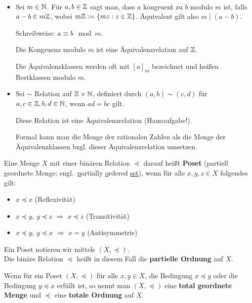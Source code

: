 \begin{bsp}\
\begin{itemize}	
	\item Sei $ m \in \mathbb{N} $. Für $ a,b \in \mathbb{Z} $ sagt man, dass $ a $ kongruent zu $ b $ modulo $ m $ ist, falls $ a-b \in m\mathbb{Z} $, wobei $ m\mathbb{Z} := \{ mz : z \in \mathbb{Z} \} $. Äquivalent gilt also $m \mid (a-b)$.
	
	Schreibweise: $ a \equiv b \mod{m} $.
	
	Die Kongruenz modulo $ m $ ist eine Äquivalenzrelation auf $ \mathbb{Z} $.
	
	Die Äquivalenzklassen werden oft mit $[a]_m$ bezeichnet und heißen Restklassen modulo $m$.
	
	\item Sei $ \sim $ Relation auf $ \mathbb{Z} \times \mathbb{N} $, definiert durch $ (a,b) \sim (c,d) $ für $ a,c \in \mathbb{Z}, b,d \in \mathbb{N} $, wenn $ ad = bc $ gilt.
	
	Diese Relation ist eine Äquivalenzrelation (Hausaufgabe!).
	
	Formal kann man die Menge der rationalen Zahlen als die Menge der Äquiva\-lenz\-klassen bzgl. dieser Äquivalenzrelation umsetzen. 
\end{itemize}
\end{bsp}


\begin{defn}
	Eine Menge $X$ mit einer binären Relation $\preceq$ darauf heißt \textbf{Poset} (partiell geordnete Menge; engl.~\underline{p}artially \underline{o}rdered \underline{set}), wenn für alle $x,y,z \in X$ folgendes gilt: 
	\begin{itemize}
		\item $x \preceq x$ (Reflexivität)
		\item $x \preceq y, \ y \preceq z$ $\Rightarrow$ $x \preceq z$ (Transitivität)
		\item $x \preceq y, \ y \preceq x$ $\Rightarrow$ $x = y$ (Antisymmetrie)
	\end{itemize} 
	Ein Poset notieren wir mittels $(X,\preceq)$.\\
	Die binäre Relation $\preceq$ heißt in diesem Fall die \textbf{partielle Ordnung} auf $X$. 
\end{defn} 

\begin{defn}
	Wenn für ein Poset $(X,\preceq)$ für alle $x, y \in X$, die Bedingung $x \preceq y$ oder die Bedingung $y \preceq x$ erfüllt ist, so nennt man $(X,\preceq)$ eine \textbf{total geordnete Menge} und $\preceq$ eine \textbf{totale Ordnung} auf $X$. 
\end{defn} 

